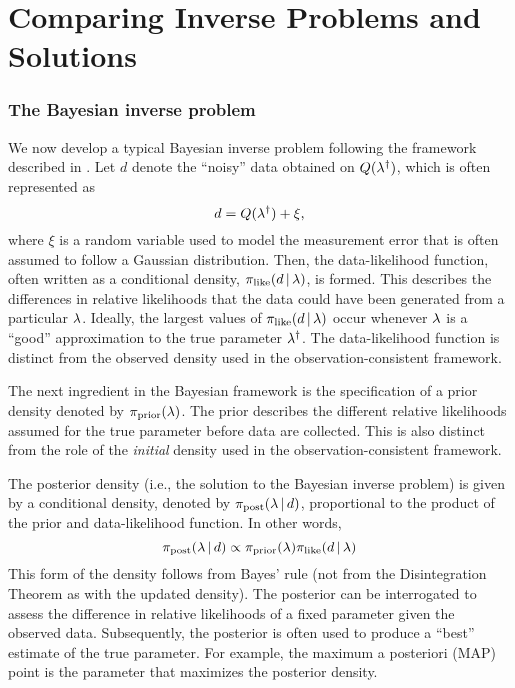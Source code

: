 \section{Comparing Inverse Problems and Solutions}\label{sec:compare}

\subsubsection{The Bayesian inverse problem}

We now develop a typical Bayesian inverse problem following the framework described in \cite{Stuart10}.
Let $d$ denote the ``noisy'' data obtained on $Q(\lambda^\dagger)$, which is often represented as
\begin{equation*}
	d = Q(\lambda^\dagger) + \xi,
\end{equation*}
where $\xi$ is a random variable used to model the measurement error that is often assumed to follow a Gaussian distribution.
Then, the data-likelihood function, often written as a conditional density, $\pi_\text{like}(d\, |\, \lambda)$, is formed.
This describes the differences in relative likelihoods that the data could have been generated from a particular $\lambda$.
Ideally, the largest values of $\pi_\text{like}(d\, | \, \lambda)$ occur whenever $\lambda$ is a ``good'' approximation to the true parameter $\lambda^\dagger$.
The data-likelihood function is distinct from the observed density used in the observation-consistent framework.

The next ingredient in the Bayesian framework is the specification of a prior density denoted by $\pi_\text{prior}(\lambda)$.
The prior describes the different relative likelihoods assumed for the true parameter before data are collected.
This is also distinct from the role of the {\em initial} density used in the observation-consistent framework.

The posterior density (i.e., the solution to the Bayesian inverse problem) is given by a conditional density, denoted by $\pi_\text{post}(\lambda\, | \, d)$, proportional to the product of the prior and data-likelihood function.
In other words,
\begin{equation*}
	\pi_\text{post}(\lambda\, | \, d) \propto \pi_\text{prior}(\lambda)\pi_\text{like}(d\, | \, \lambda)
\end{equation*}
This form of the density follows from Bayes' rule (not from the Disintegration Theorem as with the updated density).
The posterior can be interrogated to assess the difference in relative likelihoods of a fixed parameter given the observed data.
Subsequently, the posterior is often used to produce a ``best'' estimate of the true parameter.
For example, the maximum a posteriori (MAP) point is the parameter that maximizes the posterior density.

